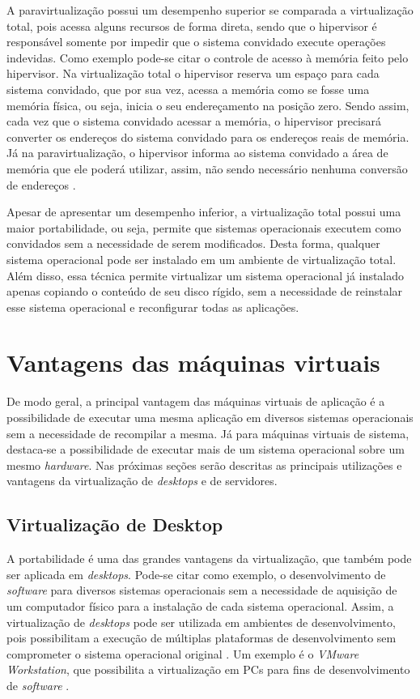 A paravirtualização possui um desempenho superior se comparada a virtualização total, pois acessa alguns recursos de forma direta, sendo que 
o hipervisor é responsável somente por impedir que o sistema convidado execute operações indevidas. Como exemplo pode-se citar o controle de
acesso à memória feito pelo hipervisor. Na virtualização total o hipervisor reserva um espaço para cada sistema convidado, que por sua vez, 
acessa a memória como se fosse uma memória física, ou seja, inicia o seu endereçamento na posição zero. Sendo assim, cada vez que o sistema 
convidado acessar a memória, o hipervisor precisará converter os endereços do sistema convidado para os endereços reais de memória. Já na 
paravirtualização, o hipervisor informa ao sistema convidado a área de memória que ele poderá utilizar, assim, não sendo necessário nenhuma 
conversão de endereços \cite{maziero2013}.

Apesar de apresentar um desempenho inferior, a virtualização total possui uma maior portabilidade, ou seja, permite que sistemas operacionais 
executem como convidados sem a necessidade de serem modificados. Desta forma, qualquer sistema operacional pode ser instalado em um ambiente 
de virtualização total. Além disso, essa técnica permite virtualizar um sistema operacional já instalado apenas copiando o conteúdo de seu disco 
rígido, sem a necessidade de reinstalar esse sistema operacional e reconfigurar todas as aplicações.

\section{Vantagens das máquinas virtuais}
\label{section:virtvantag}

De modo geral, a principal vantagem das máquinas virtuais de aplicação é a possibilidade de executar uma mesma aplicação em diversos sistemas 
operacionais sem a necessidade de recompilar a mesma. Já para máquinas virtuais de sistema, destaca-se a possibilidade de executar mais de um 
sistema operacional sobre um mesmo \textit{hardware}. Nas próximas seções serão descritas as principais utilizações e vantagens da virtualização 
de \textit{desktops} e de servidores.

\subsection{Virtualização de Desktop}
\label{section:virtdesk}

A portabilidade é uma das grandes vantagens da virtualização, que também pode ser aplicada em \textit{desktops}. Pode-se citar como exemplo, 
o desenvolvimento de \textit{software} para diversos sistemas operacionais sem a necessidade de aquisição de um computador físico para a instalação
de cada sistema operacional. Assim, a virtualização de \textit{desktops} pode ser utilizada em ambientes de desenvolvimento, pois possibilitam 
a execução de múltiplas plataformas de desenvolvimento sem comprometer o sistema operacional original \cite{carissimi2008}. Um exemplo é o 
\textit{VMware Workstation}, que possibilita a virtualização em \ac{PC}s para fins de desenvolvimento de \textit{software} \cite{vmware2016}.

